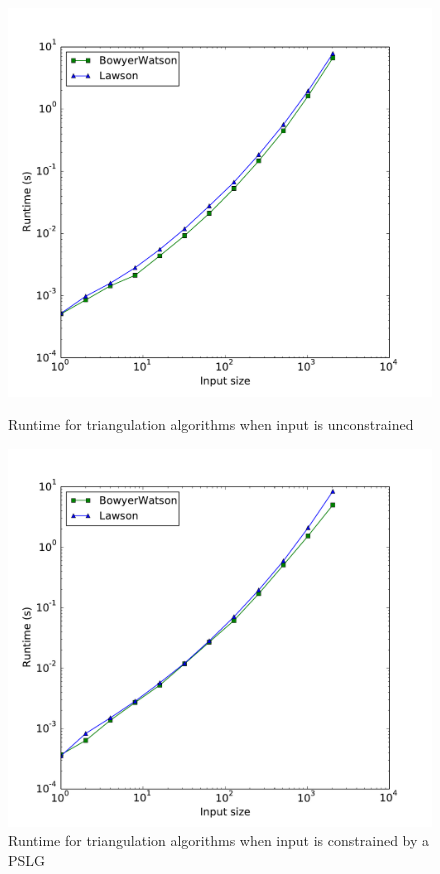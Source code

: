 \begin{figure}[ht]
    \centering
    \includegraphics[width=\columnwidth]{../images/runtime.pdf}
    \label{fig:triangulation-runtime}
    \caption{Runtime for triangulation algorithms when input is unconstrained}
\end{figure}

\begin{figure}[ht]
    \centering
    \includegraphics[width=\columnwidth]{../images/runtime_segments.pdf}
    \caption{Runtime for triangulation algorithms when input is constrained by a PSLG}
    \label{fig:triangulation-pslg-runtime}
\end{figure}

